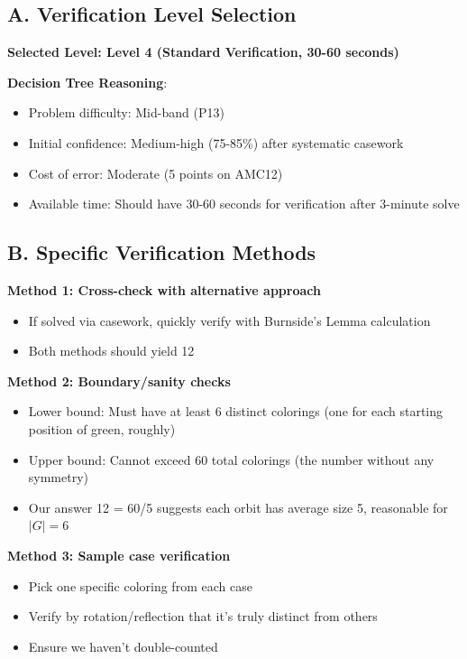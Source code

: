 \documentclass[11pt]{article}
\begin{document}
\begin{verificationbox}
\subsection*{A. Verification Level Selection}

\textbf{Selected Level: Level 4 (Standard Verification, 30-60 seconds)}

\textbf{Decision Tree Reasoning}:
\begin{itemize}
    \item Problem difficulty: Mid-band (P13)
    \item Initial confidence: Medium-high (75-85\%) after systematic casework
    \item Cost of error: Moderate (5 points on AMC12)
    \item Available time: Should have 30-60 seconds for verification after 3-minute solve
\end{itemize}

\subsection*{B. Specific Verification Methods}

\textbf{Method 1: Cross-check with alternative approach}
\begin{itemize}
    \item If solved via casework, quickly verify with Burnside's Lemma calculation
    \item Both methods should yield 12
\end{itemize}

\textbf{Method 2: Boundary/sanity checks}
\begin{itemize}
    \item Lower bound: Must have at least 6 distinct colorings (one for each starting position of green, roughly)
    \item Upper bound: Cannot exceed 60 total colorings (the number without any symmetry)
    \item Our answer 12 = 60/5 suggests each orbit has average size 5, reasonable for $|G| = 6$
\end{itemize}

\textbf{Method 3: Sample case verification}
\begin{itemize}
    \item Pick one specific coloring from each case
    \item Verify by rotation/reflection that it's truly distinct from others
    \item Ensure we haven't double-counted
\end{itemize}


\end{verificationbox}
\end{document}
